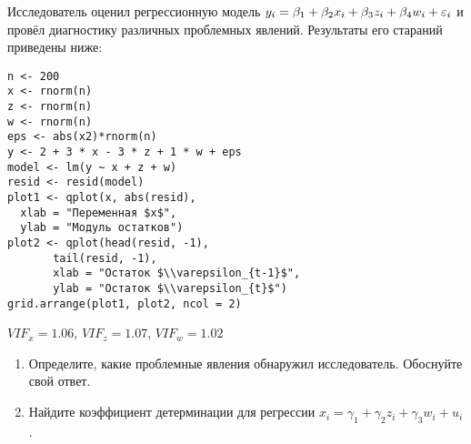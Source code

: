 \begin{problem}
Исследователь оценил регрессионную модель $y_i = \beta_1 + \beta_2 x_i + \beta_3 z_i + \beta_4 w_i + \e_i$ и провёл диагностику различных проблемных явлений. Результаты его стараний приведены ниже:



\begin{verbatim}
n <- 200
x <- rnorm(n)
z <- rnorm(n)
w <- rnorm(n)
eps <- abs(x2)*rnorm(n)
y <- 2 + 3 * x - 3 * z + 1 * w + eps
model <- lm(y ~ x + z + w)
resid <- resid(model)
plot1 <- qplot(x, abs(resid),
  xlab = "Переменная $x$",
  ylab = "Модуль остатков")
plot2 <- qplot(head(resid, -1),
       tail(resid, -1),
       xlab = "Остаток $\\varepsilon_{t-1}$",
       ylab = "Остаток $\\varepsilon_{t}$")
grid.arrange(plot1, plot2, ncol = 2)
\end{verbatim}



\begin{minipage}{0.6\textwidth}
\begin{center}
\begin{tikzpicture}[scale = 0.025]

\end{tikzpicture}
\end{center}
\end{minipage}

$VIF_x = 1.06$, $VIF_z = 1.07$, $VIF_w = 1.02$
\begin{enumerate}
\item Определите, какие проблемные явления обнаружил исследователь. Обоснуйте свой ответ.
\item Найдите коэффициент детерминации для регрессии $x_{i} = \gamma_1 + \gamma_2 z_i + \gamma_3 w_i + u_i$.
\end{enumerate}



\begin{sol}
\end{sol}
\end{problem}



